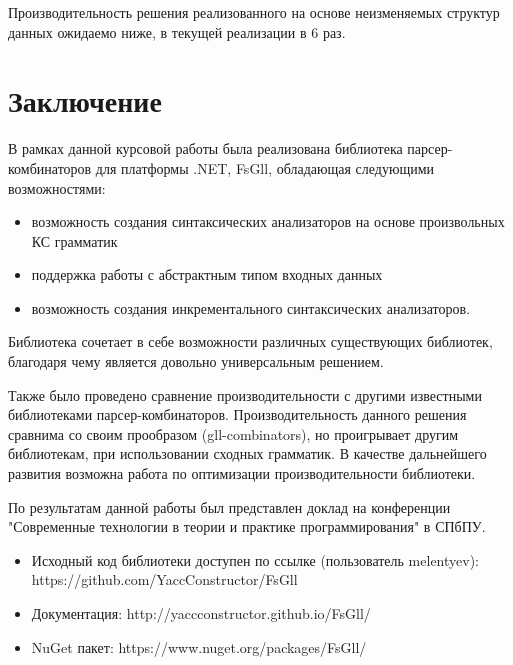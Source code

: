 \documentclass[14pt]{matmex-diploma}
\begin{document}
Производительность решения реализованного на основе неизменяемых структур данных ожидаемо ниже, 
в текущей реализации в 6 раз.



\section*{Заключение}
В рамках данной курсовой работы была реализована библиотека парсер-комбинаторов 
для платформы .NET, FsGll, обладающая следующими возможностями:
\begin{itemize}
    \item возможность создания синтаксических анализаторов на основе произвольных КС грамматик
    \item поддержка работы с абстрактным типом входных данных 
    \item возможность создания инкрементального синтаксических анализаторов.
\end{itemize}

Библиотека сочетает в себе возможности различных существующих библиотек, 
благодаря чему является довольно универсальным решением. 

Также было проведено сравнение производительности с другими известными библиотеками парсер-комбинаторов.
Производительность данного решения сравнима со своим прообразом (gll-combinators), 
но проигрывает другим библиотекам, при использовании сходных грамматик. В качестве дальнейшего развития возможна работа по оптимизации производительности библиотеки. 

По результатам данной работы был представлен доклад на конференции 
"Современные технологии в теории и практике программирования" в СПбПУ.

\begin{itemize}
    \item Исходный код библиотеки доступен по ссылке (пользователь melentyev): https://github.com/YaccConstructor/FsGll
    \item Документация: http://yaccconstructor.github.io/FsGll/
    \item NuGet пакет: https://www.nuget.org/packages/FsGll/
\end{itemize}


\setmonofont[Mapping=tex-text]{CMU Typewriter Text}


\end{document}
